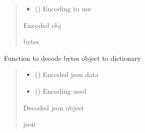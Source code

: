 \documentclass[letterpaper,10pt,english]{sphinxmanual}
\begin{document}
\begin{fulllineitems}
\begin{fulllineitems}
\begin{quote}
\begin{description}
\begin{itemize}
\item {} 
\sphinxAtStartPar
{} () \textendash{} Encoding to use

\end{itemize}

\sphinxAtStartPar
Encoded obj

\sphinxAtStartPar
bytes

\end{description}\end{quote}

\end{fulllineitems}


\begin{fulllineitems}
\label{\detokenize{Message:Message.Message._json_decode}}
\pysigstartsignatures
{}
\pysigstopsignatures
\sphinxAtStartPar
Function to decode bytes object to dictionary
\begin{quote}\begin{description}
\begin{itemize}
\item {} 
\sphinxAtStartPar
{} () \textendash{} Encoded json data

\item {} 
\sphinxAtStartPar
{} () \textendash{} Encoding used

\end{itemize}

\sphinxAtStartPar
Decoded json object

\sphinxAtStartPar
json

\end{description}\end{quote}

\end{fulllineitems}


\end{fulllineitems}
\end{document}
